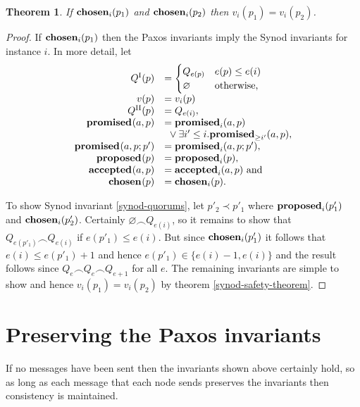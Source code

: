 \documentclass[journal]{IEEEtran}
\newtheorem{theorem}{Theorem}
\begin{document}
\begin{theorem}\label{paxos-safety-theorem} If $\mathbf{chosen}_{i}(p_1)$ and
$\mathbf{chosen}_{i}(p_2)$ then ${v_i(p_1) = v_i(p_2)}$.  \end{theorem}

\begin{proof}
If $\mathbf{chosen}_{i}(p_1)$ then the Paxos invariants imply the Synod invariants for
instance $i$.  In more detail, let
\[\begin{array}{rl}
Q^\textrm{I}(p) &= \begin{cases}
Q_{e(p)} & e(p) \le e(i) \\
\varnothing & \textrm{otherwise,} \end{cases} \\
v(p) &= v_i(p)\\
Q^\textrm{II}(p) &= Q_{e(i)}, \\
\mathbf{promised}_{}(a,p) &= \mathbf{promised}_{i}(a,p) \\
& \ {}\vee \exists i' \le i. \mathbf{promised}_{\ge i'}(a,p), \\
\mathbf{promised}_{}(a,p;p') &= \mathbf{promised}_{i}(a,p;p'), \\
\mathbf{proposed}_{}(p) &= \mathbf{proposed}_{i}(p), \\
\mathbf{accepted}_{}(a,p) &= \mathbf{accepted}_{i}(a,p) \textrm{ and} \\
\mathbf{chosen}_{}(p) &= \mathbf{chosen}_{i}(p). \\
\end{array}
\]

To show Synod invariant \ref{synod-quorums}, let $p'_2 \prec p'_1$ where
$\mathbf{proposed}_{i}(p'_1)$ and $\mathbf{chosen}_{i}(p'_2)$. Certainly $\varnothing \frown
Q_{e(i)}$, so it remains to show that $Q_{e(p'_1)} \frown Q_{e(i)}$ if $e(p'_1)
\le e(i)$.  But since $\mathbf{chosen}_{i}(p'_1)$ it follows that $e(i) \le e(p'_1) + 1$
and hence $e(p'_1) \in \{e(i) - 1, e(i)\}$ and the result follows since ${Q_e
\frown Q_e \frown Q_{e+1}}$ for all $e$. The remaining invariants are simple to
show and hence $v_i(p_1) = v_i(p_2)$ by theorem \ref{synod-safety-theorem}.
\end{proof}

\section{Preserving the Paxos invariants}

If no messages have been sent then the invariants shown above certainly hold,
so as long as each message that each node sends preserves the invariants then
consistency is maintained.
\end{document}

